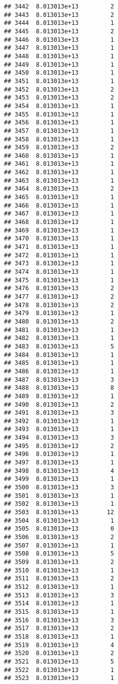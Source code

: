 \documentclass[
]{article}
\begin{document}
\begin{verbatim}
## 3442  8.013013e+13         2
## 3443  8.013013e+13         2
## 3444  8.013013e+13         1
## 3445  8.013013e+13         2
## 3446  8.013013e+13         1
## 3447  8.013013e+13         1
## 3448  8.013013e+13         1
## 3449  8.013013e+13         1
## 3450  8.013013e+13         1
## 3451  8.013013e+13         1
## 3452  8.013013e+13         2
## 3453  8.013013e+13         2
## 3454  8.013013e+13         1
## 3455  8.013013e+13         1
## 3456  8.013013e+13         1
## 3457  8.013013e+13         1
## 3458  8.013013e+13         1
## 3459  8.013013e+13         2
## 3460  8.013013e+13         1
## 3461  8.013013e+13         1
## 3462  8.013013e+13         1
## 3463  8.013013e+13         1
## 3464  8.013013e+13         2
## 3465  8.013013e+13         1
## 3466  8.013013e+13         1
## 3467  8.013013e+13         1
## 3468  8.013013e+13         1
## 3469  8.013013e+13         1
## 3470  8.013013e+13         1
## 3471  8.013013e+13         1
## 3472  8.013013e+13         1
## 3473  8.013013e+13         1
## 3474  8.013013e+13         1
## 3475  8.013013e+13         1
## 3476  8.013013e+13         2
## 3477  8.013013e+13         2
## 3478  8.013013e+13         2
## 3479  8.013013e+13         1
## 3480  8.013013e+13         2
## 3481  8.013013e+13         1
## 3482  8.013013e+13         1
## 3483  8.013013e+13         5
## 3484  8.013013e+13         1
## 3485  8.013013e+13         1
## 3486  8.013013e+13         1
## 3487  8.013013e+13         3
## 3488  8.013013e+13         8
## 3489  8.013013e+13         1
## 3490  8.013013e+13         2
## 3491  8.013013e+13         3
## 3492  8.013013e+13         1
## 3493  8.013013e+13         1
## 3494  8.013013e+13         3
## 3495  8.013013e+13         2
## 3496  8.013013e+13         1
## 3497  8.013013e+13         1
## 3498  8.013013e+13         4
## 3499  8.013013e+13         1
## 3500  8.013013e+13         3
## 3501  8.013013e+13         1
## 3502  8.013013e+13         1
## 3503  8.013013e+13        12
## 3504  8.013013e+13         1
## 3505  8.013013e+13         0
## 3506  8.013013e+13         2
## 3507  8.013013e+13         1
## 3508  8.013013e+13         5
## 3509  8.013013e+13         2
## 3510  8.013013e+13         1
## 3511  8.013013e+13         2
## 3512  8.013013e+13         1
## 3513  8.013013e+13         3
## 3514  8.013013e+13         1
## 3515  8.013013e+13         1
## 3516  8.013013e+13         3
## 3517  8.013013e+13         2
## 3518  8.013013e+13         1
## 3519  8.013013e+13         4
## 3520  8.013013e+13         2
## 3521  8.013013e+13         5
## 3522  8.013013e+13         1
## 3523  8.013013e+13         1

\end{verbatim}
\end{document}
